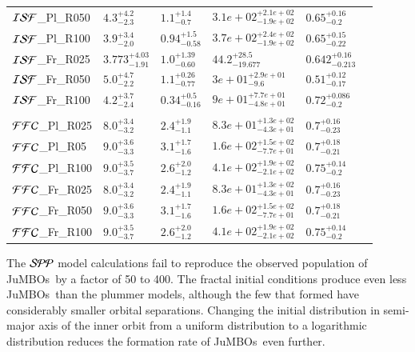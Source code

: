 \documentclass[aa]{lib/aa}
\newcommand{\jumbos}{\mbox{JuMBOs}}
\begin{document}
\begin{table}
\begin{tabular}{llllll}
${\cal ISF}$\_Pl\_R050 & $4.3^{+4.2}_{-2.3}$ & $1.1^{+1.4}_{-0.7}$ & $3.1e+02^{+2.1e+02}_{-1.9e+02}$ & $0.65^{+0.16}_{-0.2}$ \\
${\cal ISF}$\_Pl\_R100 & $3.9^{+3.4}_{-2.0}$ & $0.94^{+1.5}_{-0.58}$ & $3.7e+02^{+2.4e+02}_{-1.9e+02}$ & $0.65^{+0.15}_{-0.22}$ \\
${\cal ISF}$\_Fr\_R025 & $3.773^{+4.03}_{-1.91}$ & $1.0^{+1.39}_{-0.60}$ & $44.2^{+28.5}_{-19.677}$ & $0.642^{+0.16}_{-0.213}$ \\
${\cal ISF}$\_Fr\_R050 & $5.0^{+4.7}_{-2.2}$ & $1.1^{+0.26}_{-0.77}$ & $3e+01^{+2.9e+01}_{-9.6}$ & $0.51^{+0.12}_{-0.17}$ \\
${\cal ISF}$\_Fr\_R100 & $4.2^{+3.7}_{-2.4}$ & $0.34^{+0.5}_{-0.16}$ & $9e+01^{+7.7e+01}_{-4.8e+01}$ & $0.72^{+0.086}_{-0.2}$ \\
  \hline \vspace{-0.75em} \\
${\cal FFC}$\_Pl\_R025 & $8.0^{+3.4}_{-3.2}$ & $2.4^{+1.9}_{-1.1}$ & $8.3e+01^{+1.3e+02}_{-4.3e+01}$ & $0.7^{+0.16}_{-0.23}$ \\
${\cal FFC}$\_Pl\_R05 &  $9.0^{+3.6}_{-3.3}$ & $3.1^{+1.7}_{-1.6}$ & $1.6e+02^{+1.5e+02}_{-7.7e+01}$ & $0.7^{+0.18}_{-0.21}$ \\ 
  ${\cal FFC}$\_Pl\_R100 &  $9.0^{+3.5}_{-3.7}$ & $2.6^{+2.0}_{-1.2}$ & $4.1e+02^{+1.9e+02}_{-2.1e+02}$ & $0.75^{+0.14}_{-0.2}$ \\
  ${\cal FFC}$\_Fr\_R025   & $8.0^{+3.4}_{-3.2}$ & $2.4^{+1.9}_{-1.1}$ & $8.3e+01^{+1.3e+02}_{-4.3e+01}$ & $0.7^{+0.16}_{-0.23}$ \\
  ${\cal FFC}$\_Fr\_R050 & $9.0^{+3.6}_{-3.3}$ & $3.1^{+1.7}_{-1.6}$ & $1.6e+02^{+1.5e+02}_{-7.7e+01}$ & $0.7^{+0.18}_{-0.21}$ \\
  ${\cal FFC}$\_Fr\_R100 & $9.0^{+3.5}_{-3.7}$ & $2.6^{+2.0}_{-1.2}$ & $4.1e+02^{+1.9e+02}_{-2.1e+02}$ & $0.75^{+0.14}_{-0.2}$ \\
 \end{tabular}
\end{table}

The ${\cal SPP}$ model calculations fail to reproduce the observed
population of \jumbos\, by a factor of 50 to 400.  The fractal initial
conditions produce even less \jumbos\, than the plummer models,
although the few that formed have considerably smaller orbital
separations.  Changing the initial distribution in semi-major axis of
the inner orbit from a uniform distribution to a logarithmic
distribution reduces the formation rate of \jumbos\, even further.
\end{document}
